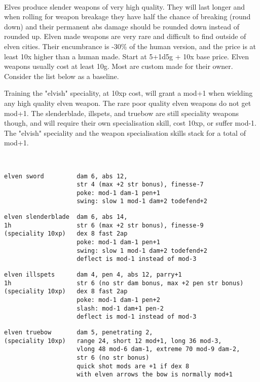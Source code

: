 \


\goodbreak
\noindent Elves produce slender weapons of very high quality. They will last longer and when rolling for weapon breakage they have half the chance of breaking (round down) and their permanent abs damage should be rounded down instead of rounded up. Elven made weapons are very rare and difficult to find outside of elven cities. Their encumbrance is -30\% of the human version, and the price is at least 10x higher than a human made. Start at 5+1d5g + 10x base price. Elven weapons usually cost at least 10g. Most are custom made for their owner. Consider the list below as a baseline.

Training the "elvish" speciality, at 10xp cost, will grant a mod+1 when wielding any high quality elven weapon. The rare poor quality elven weapons do not get mod+1.
The slenderblade, illspets, and truebow are still speciality weapons though, and will require their own specialisation skill, cost 10xp, or suffer mod-1. The "elvish" speciality and the weapon specialisation skills stack for a total of mod+1.

\

\small \begin{samepage} \begin{verbatim}
elven sword         dam 6, abs 12,
                    str 4 (max +2 str bonus), finesse-7
                    poke: mod-1 dam-1 pen+1
                    swing: slow 1 mod-1 dam+2 todefend+2
\end{verbatim} \blocklistgap \begin{verbatim}
elven slenderblade  dam 6, abs 14,
1h                  str 6 (max +2 str bonus), finesse-9
(speciality 10xp)   dex 8 fast 2ap
                    poke: mod-1 dam-1 pen+1
                    swing: slow 1 mod-1 dam+2 todefend+2
                    deflect is mod-1 instead of mod-3
\end{verbatim} \blocklistgap \begin{verbatim}
elven illspets      dam 4, pen 4, abs 12, parry+1
1h                  str 6 (no str dam bonus, max +2 pen str bonus)
(speciality 10xp)   dex 8 fast 2ap
                    poke: mod-1 dam-1 pen+2
                    slash: mod-1 dam+1 pen-2
                    deflect is mod-1 instead of mod-3
\end{verbatim} \blocklistgap \begin{verbatim}
elven truebow       dam 5, penetrating 2,
(speciality 10xp)   range 24, short 12 mod+1, long 36 mod-3,
                    vlong 48 mod-6 dam-1, extreme 70 mod-9 dam-2,
                    str 6 (no str bonus)
                    quick shot mods are +1 if dex 8
                    with elven arrows the bow is normally mod+1
\end{verbatim} \end{samepage} \normalsize


